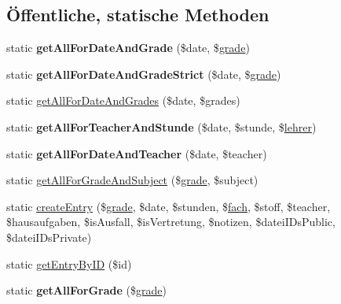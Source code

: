 \subsection*{Öffentliche, statische Methoden}
\begin{DoxyCompactItemize}
\item 
\mbox{\label{class_tagebuch_klasse_entry_adfc6fcbd17395d7db30e776145ccb10e}} 
static {\bfseries get\+All\+For\+Date\+And\+Grade} (\$date, \$\mbox{\hyperlink{classgrade}{grade}})
\item 
\mbox{\label{class_tagebuch_klasse_entry_a38fa2ba82b843dabb96589f6aa604b9f}} 
static {\bfseries get\+All\+For\+Date\+And\+Grade\+Strict} (\$date, \$\mbox{\hyperlink{classgrade}{grade}})
\item 
static \mbox{\hyperlink{class_tagebuch_klasse_entry_a4fa4f7ba75140410b7e637a6164e5054}{get\+All\+For\+Date\+And\+Grades}} (\$date, \$grades)
\item 
\mbox{\label{class_tagebuch_klasse_entry_ab5483d245e368edc0383a1c60f1ae388}} 
static {\bfseries get\+All\+For\+Teacher\+And\+Stunde} (\$date, \$stunde, \$\mbox{\hyperlink{classlehrer}{lehrer}})
\item 
\mbox{\label{class_tagebuch_klasse_entry_a944a3a9442c2416427f7ee8b38265af4}} 
static {\bfseries get\+All\+For\+Date\+And\+Teacher} (\$date, \$teacher)
\item 
static \mbox{\hyperlink{class_tagebuch_klasse_entry_a379f79055218b1ee2d735e5f45c4e9c2}{get\+All\+For\+Grade\+And\+Subject}} (\$\mbox{\hyperlink{classgrade}{grade}}, \$subject)
\item 
static \mbox{\hyperlink{class_tagebuch_klasse_entry_ad7e4d249134650c99710220ea326e258}{create\+Entry}} (\$\mbox{\hyperlink{classgrade}{grade}}, \$date, \$stunden, \$\mbox{\hyperlink{classfach}{fach}}, \$stoff, \$teacher, \$hausaufgaben, \$is\+Ausfall, \$is\+Vertretung, \$notizen, \$datei\+I\+Ds\+Public, \$datei\+I\+Ds\+Private)
\item 
static \mbox{\hyperlink{class_tagebuch_klasse_entry_ab12e1d13b2ac4cc787b56c021fd30bd4}{get\+Entry\+By\+ID}} (\$id)
\item 
\mbox{\label{class_tagebuch_klasse_entry_aa22f0b31264875ecbdec6936b15eb889}} 
static {\bfseries get\+All\+For\+Grade} (\$\mbox{\hyperlink{classgrade}{grade}})
\end{DoxyCompactItemize}


